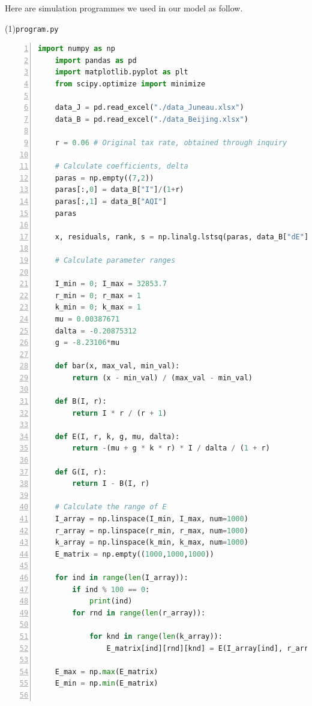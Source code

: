 \documentclass[UTF8]{mcmthesis}
\begin{document}
    \begin{appendices}
        Here are simulation programmes we used in our model as follow.
        
        \vspace{.5em}
        \noindent(1)\quad \verb|program.py|
        \vspace{.5em}
        \begin{lstlisting}[language = python, numbers = left]
    import numpy as np
    import pandas as pd
    import matplotlib.pyplot as plt
    from scipy.optimize import minimize
    
    data_J = pd.read_excel("./data_Juneau.xlsx")
    data_B = pd.read_excel("./data_Beijing.xlsx")
    
    r = 0.06 # Original tax rate, obtained through inquiry
    
    # Calculate coefficients, delta
    paras = np.empty((7,2))
    paras[:,0] = data_B["I"]/(1+r)
    paras[:,1] = data_B["AQI"]
    paras
    
    x, residuals, rank, s = np.linalg.lstsq(paras, data_B["dE"], rcond=None)
    
    # Calculate parameter ranges
    
    I_min = 0; I_max = 32853.7
    r_min = 0; r_max = 1
    k_min = 0; k_max = 1
    mu = 0.00387671
    dalta = -0.20875312
    g = -8.23106*mu
    
    def bar(x, max_val, min_val):
        return (x - min_val) / (max_val - min_val)
    
    def B(I, r):
        return I * r / (r + 1)
    
    def E(I, r, k, g, mu, dalta):
        return -(mu + g * k * r) * I / dalta / (1 + r)
    
    def G(I, r):
        return I - B(I, r)
    
    # Calculate the range of E
    I_array = np.linspace(I_min, I_max, num=1000)
    r_array = np.linspace(r_min, r_max, num=1000)
    k_array = np.linspace(k_min, k_max, num=1000)
    E_matrix = np.empty((1000,1000,1000))
    
    for ind in range(len(I_array)):
        if ind % 100 == 0:
            print(ind)
        for rnd in range(len(r_array)):
    
            for knd in range(len(k_array)):
                E_matrix[ind][rnd][knd] = E(I_array[ind], r_array[rnd], k_array[knd], g, mu, dalta)
    
    E_max = np.max(E_matrix)
    E_min = np.min(E_matrix)
    

\end{lstlisting}
\end{appendices}
\end{document}
